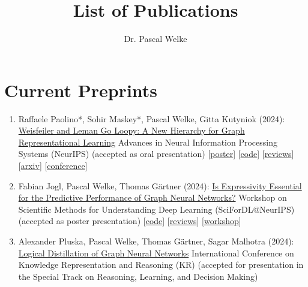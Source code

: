 \documentclass{scrartcl}
\author{Dr. Pascal Welke}
\title{List of Publications}
\begin{document}
\setcounter{saveenumi}{0}
\newcommand{\seti}{\setcounter{saveenumi}{\value{enumi}}}
\newcommand{\conti}{\setcounter{enumi}{\value{saveenumi}}}


\section{Current Preprints}
\begin{enumerate}
\conti
\item
\label{maskey2024loopy}
Raffaele Paolino*, Sohir Maskey*, Pascal Welke, Gitta Kutyniok (2024):\newline
\href{https://pwelke.github.io/}{Weisfeiler and Leman Go Loopy: A New Hierarchy for Graph Representational Learning}\newline
Advances in Neural Information Processing Systems (NeurIPS)\newline
(accepted as oral presentation)\newline
{\footnotesize
[\href{https://pwelke.github.io/publications/paolino2024loopyBGPTposter.pdf}{poster}]
[\href{https://github.com/RPaolino/loopy}{code}]
[\href{https://openreview.net/forum?id=9O2sVnEHor}{reviews}]
[\href{https://arxiv.org/abs/2403.13749}{arxiv}]
[\href{https://neurips.cc}{conference}]
}
\item
\label{jogl2023expressivitynotallweneed}
Fabian Jogl, Pascal Welke, Thomas Gärtner (2024):\newline
\href{https://pwelke.github.io/}{Is Expressivity Essential for the Predictive Performance of Graph Neural Networks?}\newline
Workshop on Scientific Methods for Understanding Deep Learning (SciForDL@NeurIPS)\newline
(accepted as poster presentation)\newline
{\footnotesize
[\href{https://anonymous.4open.science/r/ExpressivenessTransferGNNs-55CB/README.md}{code}]
[\href{https://openreview.net/forum?id=5v7hpSy3Ir}{reviews}]
[\href{https://scienceofdlworkshop.github.io}{workshop}]
}
\item
\label{pluska2024logicaldistillation}
Alexander Pluska, Pascal Welke, Thomas Gärtner, Sagar Malhotra (2024):\newline
\href{https://pwelke.github.io/publications/pluska2024logicaldistillationkr.pdf}{Logical Distillation of Graph Neural Networks}\newline
International Conference on Knowledge Representation and Reasoning (KR)\newline
(accepted for presentation in the Special Track on Reasoning, Learning, and Decision Making)\newline

\end{enumerate}
\end{document}
